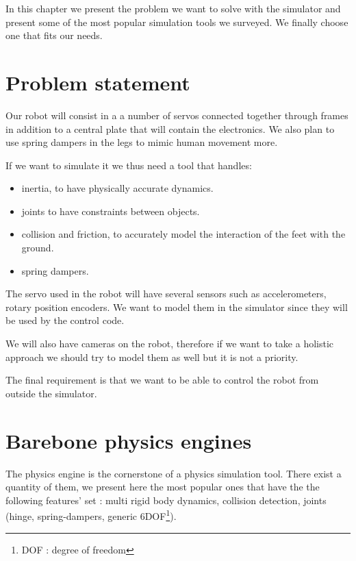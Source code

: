 In this chapter we present the problem we want to solve with the simulator and present some of the most popular simulation tools we surveyed. We finally choose one that fits our needs.

\section{Problem statement}
Our robot will consist in a a number of servos connected together through frames in addition to a central plate that will contain the electronics. We also plan to use spring dampers in the legs to mimic human movement more.

If we want to simulate it we thus need a tool that handles:\begin{itemize}
\item inertia, to have physically accurate dynamics.
\item joints to have constraints between objects.
\item collision and friction, to accurately model the interaction of the feet with the ground.
\item spring dampers.
\end{itemize}

The servo used in the robot will have several sensors such as accelerometers, rotary position encoders. We want to model them in the simulator since they will be used by the control code. 

We will also have cameras on the robot, therefore if we want to take a holistic approach we should try to model them as well but it is not a priority. 

The final requirement is that we want to be able to control the robot from outside the simulator.

\section{Barebone physics engines}
The physics engine is the cornerstone of a physics simulation tool. There exist a quantity of them, we present here the most popular ones that have the the following features' set :  multi rigid body dynamics, collision detection, joints (hinge, spring-dampers, generic 6DOF\footnote{DOF : degree of freedom}). 

